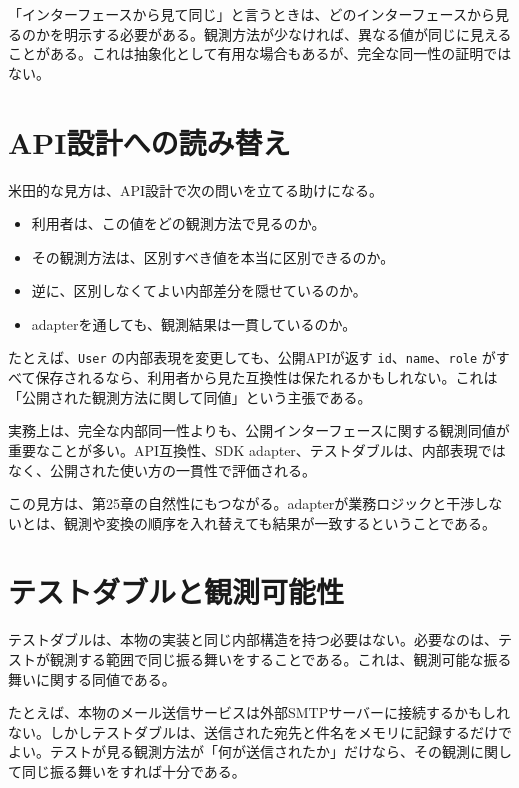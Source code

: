 \begin{warningbox}
「インターフェースから見て同じ」と言うときは、どのインターフェースから見るのかを明示する必要がある。観測方法が少なければ、異なる値が同じに見えることがある。これは抽象化として有用な場合もあるが、完全な同一性の証明ではない。
\end{warningbox}

\section{API設計への読み替え}

米田的な見方は、API設計で次の問いを立てる助けになる。

\begin{itemize}
\item 利用者は、この値をどの観測方法で見るのか。
\item その観測方法は、区別すべき値を本当に区別できるのか。
\item 逆に、区別しなくてよい内部差分を隠せているのか。
\item adapterを通しても、観測結果は一貫しているのか。
\end{itemize}

たとえば、\texttt{User} の内部表現を変更しても、公開APIが返す \texttt{id}、\texttt{name}、\texttt{role} がすべて保存されるなら、利用者から見た互換性は保たれるかもしれない。これは「公開された観測方法に関して同値」という主張である。

\begin{softwarebox}
実務上は、完全な内部同一性よりも、公開インターフェースに関する観測同値が重要なことが多い。API互換性、SDK adapter、テストダブルは、内部表現ではなく、公開された使い方の一貫性で評価される。
\end{softwarebox}

この見方は、第25章の自然性にもつながる。adapterが業務ロジックと干渉しないとは、観測や変換の順序を入れ替えても結果が一致するということである。

\section{テストダブルと観測可能性}

テストダブルは、本物の実装と同じ内部構造を持つ必要はない。必要なのは、テストが観測する範囲で同じ振る舞いをすることである。これは、観測可能な振る舞いに関する同値である。

たとえば、本物のメール送信サービスは外部SMTPサーバーに接続するかもしれない。しかしテストダブルは、送信された宛先と件名をメモリに記録するだけでよい。テストが見る観測方法が「何が送信されたか」だけなら、その観測に関して同じ振る舞いをすれば十分である。

